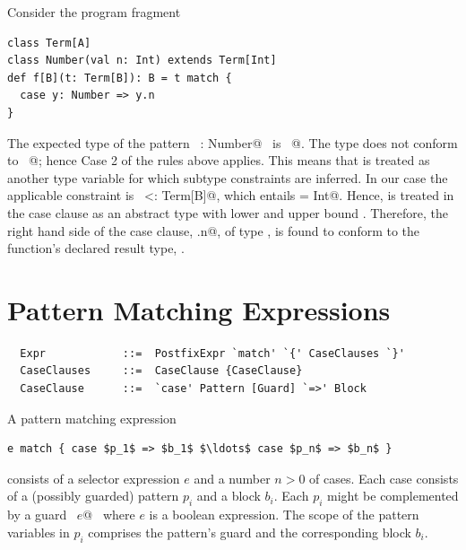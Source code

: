 \example
Consider the program fragment
\begin{lstlisting}
class Term[A]
class Number(val n: Int) extends Term[Int]
def f[B](t: Term[B]): B = t match {
  case y: Number => y.n
}
\end{lstlisting}
The expected type of the pattern ~\lstinline@y: Number@~ is
~\lstinline@Term[B]@.  The type  does not conform to
~\lstinline@Term[B]@; hence Case 2 of the rules above
applies. This means that \lstinline@b@ is treated as another type
variable for which subtype constraints are inferred. In our case the
applicable constraint is ~\lstinline@Number <: Term[B]@, which
entails \lstinline@B = Int@.  Hence, \lstinline@B@ is treated in
the case clause as an abstract type with lower and upper bound
\lstinline@Int@. Therefore, the right hand side of the case clause,
\lstinline@y.n@, of type \lstinline@Int@, is found to conform to the
function's declared result type, \lstinline@Number@.

\section{Pattern Matching Expressions}
\label{sec:pattern-match}

\syntax\begin{lstlisting}
  Expr            ::=  PostfixExpr `match' `{' CaseClauses `}'
  CaseClauses     ::=  CaseClause {CaseClause}
  CaseClause      ::=  `case' Pattern [Guard] `=>' Block
\end{lstlisting}

A pattern matching expression
\begin{lstlisting}
e match { case $p_1$ => $b_1$ $\ldots$ case $p_n$ => $b_n$ }
\end{lstlisting}
consists of a selector expression $e$ and a number $n > 0$ of
cases. Each case consists of a (possibly guarded) pattern $p_i$ and a
block $b_i$. Each $p_i$ might be complemented by a guard
~\lstinline@if $e$@~ where $e$ is a boolean expression. 
The scope of the pattern
variables in $p_i$ comprises the pattern's guard and the corresponding block $b_i$.

